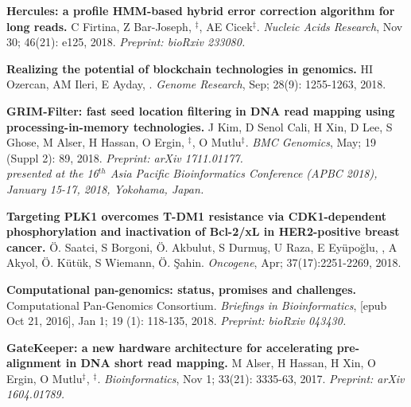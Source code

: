 \vspace{-.2cm}
                {\bf Hercules: a profile HMM-based hybrid error correction algorithm for long reads.}
                C Firtina, Z Bar-Joseph, \calkan{}$^\ddag$, AE Cicek$^\ddag$.
                {\it Nucleic Acids Research}, Nov 30; 46(21): e125, 2018. \textit{Preprint: bioRxiv 233080.}

          
         \vspace{-.2cm}

         {\bf Realizing the potential of blockchain technologies in genomics.}
         HI Ozercan, AM Ileri, E Ayday, \calkan{}.
         {\em Genome Research}, Sep; 28(9): 1255-1263, 2018.

          \vspace{-.2cm}

         {\bf GRIM-Filter: fast seed location filtering in DNA read mapping using processing-in-memory technologies.}
         J Kim, D Senol Cali, H Xin, D Lee, S Ghose, M Alser, H Hassan, O Ergin, \calkan{}$^\ddag$, O Mutlu$^\ddag$.
         {\em BMC Genomics}, May; 19 (Suppl 2): 89, 2018. \textit{Preprint: arXiv 1711.01177.}\\
         \hspace*{1cm}
          {\footnotesize \em presented at the 16$^{th}$ Asia Pacific Bioinformatics Conference (APBC 2018), January 15-17, 2018, Yokohama, Japan.}

         \vspace{-.2cm}        

         {\bf Targeting PLK1 overcomes T-DM1 resistance via CDK1-dependent phosphorylation and inactivation of Bcl-2/xL in HER2-positive breast cancer.}
         Ö. Saatci, S Borgoni, Ö. Akbulut, S Durmuş, U Raza, E Eyüpoğlu, \calkan{}, A Akyol, Ö. Kütük, S Wiemann, Ö. Şahin.         
         {\em Oncogene}, Apr; 37(17):2251-2269, 2018.

         

         \vspace{-.2cm}        

         {\bf Computational pan-genomics: status, promises and challenges.}
         Computational Pan-Genomics Consortium. {\em Briefings in Bioinformatics}, [epub Oct 21, 2016], Jan 1; 19 (1): 118-135, 2018.
         \textit{Preprint: bioRxiv 043430.}
         
         
         \vspace{-.2cm}
         
         {\bf GateKeeper: a new hardware architecture for accelerating pre-alignment in DNA short read mapping.}
         M Alser, H Hassan, H Xin, O Ergin, O Mutlu$^\ddag$, \calkan{}$^\ddag$.
         {\em Bioinformatics}, Nov 1; 33(21): 3335-63, 2017. \textit{Preprint: arXiv 1604.01789.}

